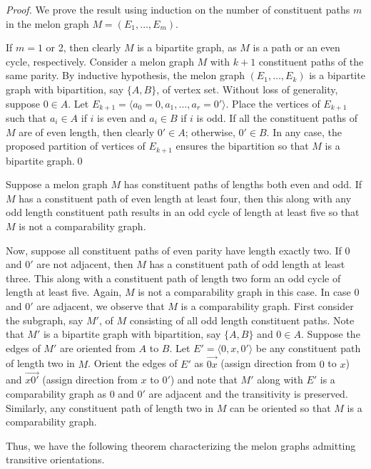 \documentclass{llncs}
\begin{document}
\begin{proof}
	We prove the result using induction on the number of constituent paths $m$ in the melon graph $M = (E_1, \ldots, E_m)$. 
	
	If $m = 1$ or 2, then clearly $M$ is a bipartite graph, as $M$ is a path or an even cycle, respectively. Consider a melon graph $M$ with $k+1$ constituent paths of the same parity. By inductive hypothesis, the melon graph $(E_1, \ldots, E_k)$ is a bipartite graph with bipartition, say $\{A, B\}$, of vertex set. Without loss of generality, suppose $0 \in A$. Let $E_{k+1} = \langle a_0 = 0, a_1, \ldots, a_r = 0'\rangle$. Place the vertices of $E_{k+1}$ such that $a_i \in A$ if $i$ is even and $a_i \in B$ if $i$ is odd. If all the constituent paths of $M$ are of even length, then clearly $0' \in A$; otherwise, $0' \in B$. In any case, the proposed partition of vertices of $E_{k+1}$ ensures the bipartition so that $M$ is a bipartite graph.\qed
\end{proof}

Suppose a melon graph $M$ has constituent paths of lengths both even and odd. If $M$ has a constituent path of even length at least four, then this along with any odd length constituent path results in an odd cycle of length at least five so that $M$ is not a comparability graph. 

Now, suppose all constituent paths of even parity have length exactly two. If $0$ and $0'$ are not adjacent, then $M$ has a constituent path of odd length at least three. This along with a constituent path of length two form an odd cycle of length at least five. Again, $M$ is not a comparability graph in this case. In case $0$ and $0'$ are adjacent, we observe that $M$ is a comparability graph. First consider the subgraph, say $M'$, of $M$ consisting of all odd length constituent paths. Note that $M'$ is a bipartite graph with bipartition, say $\{A, B\}$ and $0 \in A$. Suppose the edges of $M'$ are oriented from $A$ to $B$. Let $E' = \langle 0, x, 0' \rangle$ be any constituent path of length two in $M$. Orient the edges of $E'$ as $\overrightarrow{0x}$ (assign direction from $0$ to $x$) and $\overrightarrow{x0'}$ (assign direction from $x$ to $0'$) and note that $M'$ along with $E'$ is a comparability graph as $0$ and $0'$ are adjacent and the transitivity is preserved. Similarly, any constituent path of length two in $M$ can be oriented so that $M$ is a comparability graph. 

Thus, we have the following theorem characterizing the melon graphs admitting transitive orientations.
\end{document}
